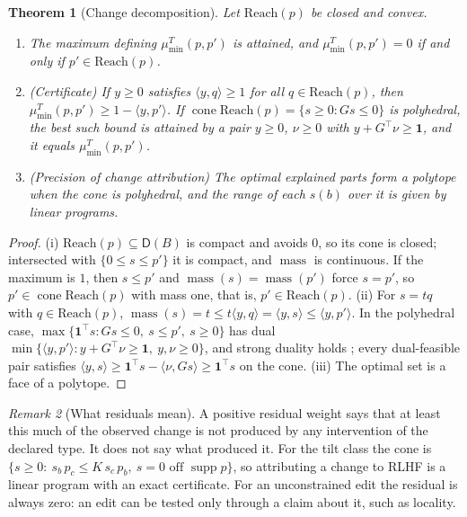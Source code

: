 \documentclass[11pt]{article}
\newtheorem{theorem}{Theorem}[section]
\theoremstyle{definition}
\theoremstyle{remark}
\newtheorem{remark}[theorem]{Remark}
\newcommand{\D}{\mathsf{D}}
\newcommand{\Reach}{\mathrm{Reach}}
\newcommand{\supp}{\operatorname{supp}}
\newcommand{\cone}{\operatorname{cone}}
\newcommand{\mass}{\operatorname{mass}}
\begin{document}
\begin{theorem}[Change decomposition]\label{thm:change}
Let $\Reach(p)$ be closed and convex.
\begin{enumerate}[label=(\roman*)]
\item The maximum defining $\mu^T_{\min}(p,p')$ is attained, and $\mu^T_{\min}(p,p')=0$ if and only if
  $p'\in\Reach(p)$.
\item (Certificate) If $y\ge0$ satisfies $\langle y,q\rangle\ge1$ for all $q\in\Reach(p)$, then
  $\mu^T_{\min}(p,p')\ge1-\langle y,p'\rangle$. If $\cone\Reach(p)=\{s\ge0:Gs\le0\}$ is polyhedral, the
  best such bound is attained by a pair $y\ge0$, $\nu\ge0$ with $y+G^{\top}\nu\ge\mathbf{1}$, and it equals
  $\mu^T_{\min}(p,p')$.
\item (Precision of change attribution) The optimal explained parts form a polytope when the cone is
  polyhedral, and the range of each $s(b)$ over it is given by linear programs.
\end{enumerate}
\end{theorem}
\begin{proof}
(i) $\Reach(p)\subseteq\D(B)$ is compact and avoids $0$, so its cone is closed; intersected with
$\{0\le s\le p'\}$ it is compact, and $\mass$ is continuous. If the maximum is $1$, then $s\le p'$ and
$\mass(s)=\mass(p')$ force $s=p'$, so $p'\in\cone\Reach(p)$ with mass one, that is, $p'\in\Reach(p)$.
(ii) For $s=tq$ with $q\in\Reach(p)$, $\mass(s)=t\le t\langle y,q\rangle=\langle y,s\rangle\le\langle
y,p'\rangle$. In the polyhedral case, $\max\{\mathbf 1^{\top}s: Gs\le0,\ s\le p',\ s\ge0\}$ has dual
$\min\{\langle y,p'\rangle:y+G^{\top}\nu\ge\mathbf 1,\ y,\nu\ge0\}$, and strong duality holds
\cite{Schrijver1986}; every dual-feasible pair satisfies $\langle y,s\rangle\ge\mathbf 1^{\top}s-\langle
\nu,Gs\rangle\ge\mathbf 1^{\top}s$ on the cone. (iii) The optimal set is a face of a polytope.
\end{proof}

\begin{remark}[What residuals mean]
A positive residual weight says that at least this much of the observed change is not produced by any
intervention of the declared type. It does not say what produced it. For the tilt class the cone is
$\{s\ge0:\ s_b\,p_c\le K\,s_c\,p_b,\ s=0\text{ off }\supp p\}$, so attributing a change to RLHF is a
linear program with an exact certificate. For an unconstrained edit the residual is always zero: an
edit can be tested only through a claim about it, such as locality.
\end{remark}
\end{document}
